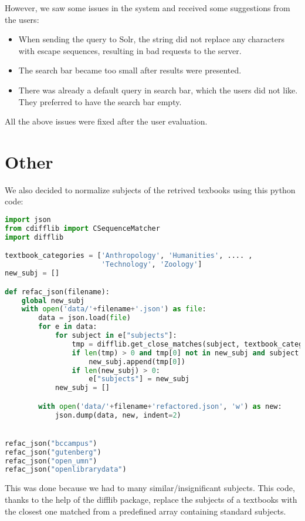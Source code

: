 \documentclass[a4paper,10pt]{report}
\begin{document}
However, we saw some issues in the system and received some suggestions from the users:

\begin{itemize}
\item When sending the query to Solr, the string did not replace any characters with escape sequences, resulting in bad requests to the server.
\item The search bar became too small after results were presented.
\item There was already a default query in search bar, which the users did not like. They preferred to have the search bar empty.
\end{itemize}

All the above issues were fixed after the user evaluation.

\newpage



\section*{Other}

We also decided to normalize subjects of the retrived texbooks using this python code:

\begin{lstlisting}[language=Python]
import json
from cdifflib import CSequenceMatcher
import difflib

textbook_categories = ['Anthropology', 'Humanities', .... ,
                       'Technology', 'Zoology']
new_subj = []

def refac_json(filename):
    global new_subj
    with open('data/'+filename+'.json') as file:
        data = json.load(file)
        for e in data:
            for subject in e["subjects"]:
                tmp = difflib.get_close_matches(subject, textbook_categories, 1, 0.6)
                if len(tmp) > 0 and tmp[0] not in new_subj and subject:
                    new_subj.append(tmp[0])
                if len(new_subj) > 0:
                    e["subjects"] = new_subj
            new_subj = []

        with open('data/'+filename+'refactored.json', 'w') as new:
            json.dump(data, new, indent=2)


refac_json("bccampus")
refac_json("gutenberg")
refac_json("open_umn")
refac_json("openlibrarydata")

\end{lstlisting}
This was done because we had to many similar/insignificant subjects. This code, thanks to the help of the difflib package, replace the subjects of a textbooks with the closest one matched from a predefined array containing standard subjects.
\end{document}
